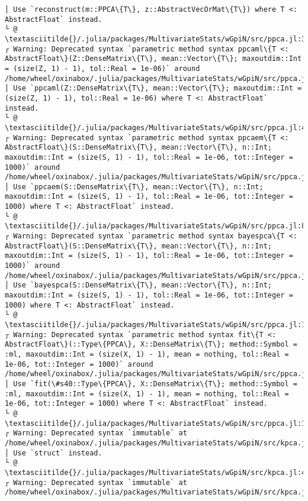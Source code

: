 \documentclass[11pt]{article}
\begin{document}
\begin{Verbatim}[commandchars=\\\{\}]
│ Use `reconstruct(m::PPCA\{T\}, z::AbstractVecOrMat\{T\}) where T <: AbstractFloat` instead.
└ @ \textasciitilde{}/.julia/packages/MultivariateStats/wGpiN/src/ppca.jl:30
┌ Warning: Deprecated syntax `parametric method syntax ppcaml\{T <: AbstractFloat\}(Z::DenseMatrix\{T\}, mean::Vector\{T\}; maxoutdim::Int = (size(Z, 1) - 1), tol::Real = 1e-06)` around /home/wheel/oxinabox/.julia/packages/MultivariateStats/wGpiN/src/ppca.jl:48.
│ Use `ppcaml(Z::DenseMatrix\{T\}, mean::Vector\{T\}; maxoutdim::Int = (size(Z, 1) - 1), tol::Real = 1e-06) where T <: AbstractFloat` instead.
└ @ \textasciitilde{}/.julia/packages/MultivariateStats/wGpiN/src/ppca.jl:48
┌ Warning: Deprecated syntax `parametric method syntax ppcaem\{T <: AbstractFloat\}(S::DenseMatrix\{T\}, mean::Vector\{T\}, n::Int; maxoutdim::Int = (size(S, 1) - 1), tol::Real = 1e-06, tot::Integer = 1000)` around /home/wheel/oxinabox/.julia/packages/MultivariateStats/wGpiN/src/ppca.jl:81.
│ Use `ppcaem(S::DenseMatrix\{T\}, mean::Vector\{T\}, n::Int; maxoutdim::Int = (size(S, 1) - 1), tol::Real = 1e-06, tot::Integer = 1000) where T <: AbstractFloat` instead.
└ @ \textasciitilde{}/.julia/packages/MultivariateStats/wGpiN/src/ppca.jl:81
┌ Warning: Deprecated syntax `parametric method syntax bayespca\{T <: AbstractFloat\}(S::DenseMatrix\{T\}, mean::Vector\{T\}, n::Int; maxoutdim::Int = (size(S, 1) - 1), tol::Real = 1e-06, tot::Integer = 1000)` around /home/wheel/oxinabox/.julia/packages/MultivariateStats/wGpiN/src/ppca.jl:125.
│ Use `bayespca(S::DenseMatrix\{T\}, mean::Vector\{T\}, n::Int; maxoutdim::Int = (size(S, 1) - 1), tol::Real = 1e-06, tot::Integer = 1000) where T <: AbstractFloat` instead.
└ @ \textasciitilde{}/.julia/packages/MultivariateStats/wGpiN/src/ppca.jl:125
┌ Warning: Deprecated syntax `parametric method syntax fit\{T <: AbstractFloat\}(::Type\{PPCA\}, X::DenseMatrix\{T\}; method::Symbol = :ml, maxoutdim::Int = (size(X, 1) - 1), mean = nothing, tol::Real = 1e-06, tot::Integer = 1000)` around /home/wheel/oxinabox/.julia/packages/MultivariateStats/wGpiN/src/ppca.jl:181.
│ Use `fit(\#s40::Type\{PPCA\}, X::DenseMatrix\{T\}; method::Symbol = :ml, maxoutdim::Int = (size(X, 1) - 1), mean = nothing, tol::Real = 1e-06, tot::Integer = 1000) where T <: AbstractFloat` instead.
└ @ \textasciitilde{}/.julia/packages/MultivariateStats/wGpiN/src/ppca.jl:181
┌ Warning: Deprecated syntax `immutable` at /home/wheel/oxinabox/.julia/packages/MultivariateStats/wGpiN/src/kpca.jl:4.
│ Use `struct` instead.
└ @ \textasciitilde{}/.julia/packages/MultivariateStats/wGpiN/src/kpca.jl:4
┌ Warning: Deprecated syntax `immutable` at /home/wheel/oxinabox/.julia/packages/MultivariateStats/wGpiN/src/kpca.jl:30.

\end{Verbatim}
\end{document}
